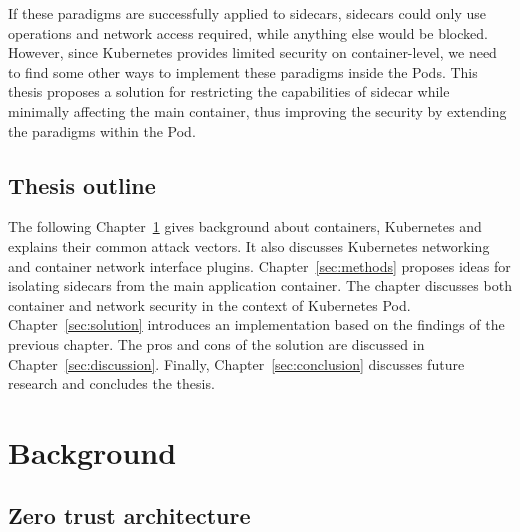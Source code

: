 \documentclass[english, 12pt, a4paper, sci, utf8, a-2b, online]{aaltothesis}
\begin{document}
If these paradigms are successfully applied to sidecars, sidecars could only use operations and network access required, while anything else would be blocked.
However, since Kubernetes provides limited security on container-level, we need to find some other ways to implement these paradigms inside the Pods.
This thesis proposes a solution for restricting the capabilities of sidecar while minimally affecting the main container, thus improving the security by extending the paradigms within the Pod.

\subsection{Thesis outline}

The following Chapter~\ref{sec:bg} gives background about containers, Kubernetes and explains their common attack vectors.
It also discusses Kubernetes networking and container network interface plugins.
Chapter~\ref{sec:methods} proposes ideas for isolating sidecars from the main application container.
The chapter discusses both container and network security in the context of Kubernetes Pod.
Chapter~\ref{sec:solution} introduces an implementation based on the findings of the previous chapter.
The pros and cons of the solution are discussed in Chapter~\ref{sec:discussion}.
Finally, Chapter~\ref{sec:conclusion} discusses future research and concludes the thesis.

\clearpage

\section{Background} \label{sec:bg}

\subsection{Zero trust architecture}

\end{document}
